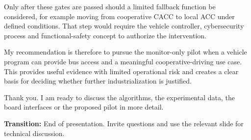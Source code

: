 \documentclass[11pt,a4paper]{article}
\newcommand{\transition}[1]{%
  \vfill
  \colorbox{Panel}{%
    \parbox{\dimexpr\textwidth-2\fboxsep\relax}{%
      \raggedright\textbf{Transition:} #1}}
}
\begin{document}
Only after these gates are passed should a limited fallback function be considered, for example moving from cooperative CACC to local ACC under defined conditions. That step would require the vehicle controller, cybersecurity process and functional-safety concept to authorize the intervention.

My recommendation is therefore to pursue the monitor-only pilot when a vehicle program can provide bus access and a meaningful cooperative-driving use case. This provides useful evidence with limited operational risk and creates a clear basis for deciding whether further industrialization is justified.

Thank you. I am ready to discuss the algorithms, the experimental data, the board interfaces or the proposed pilot in more detail.

\transition{End of presentation. Invite questions and use the relevant slide for technical discussion.}
\end{document}
